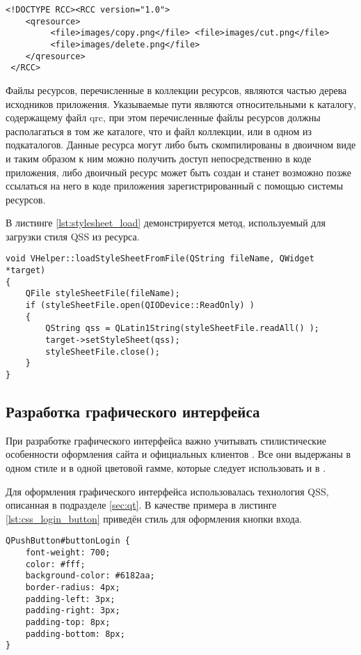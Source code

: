 \begin{lstlisting}[style = cssstyle, 
				   caption = {Пример файла qrc},
				   label = lst:qrc_example] 
<!DOCTYPE RCC><RCC version="1.0"> 
	<qresource>
	     <file>images/copy.png</file> <file>images/cut.png</file>
	     <file>images/delete.png</file>
	</qresource>
 </RCC>
\end{lstlisting} 

Файлы ресурсов, перечисленные в коллекции ресурсов, являются частью дерева
исходников приложения. Указываемые пути являются относительными к каталогу,
содержащему файл qrc, при этом перечисленные файлы ресурсов должны располагаться
в том же каталоге, что и файл коллекции, или в одном из подкаталогов.
Данные ресурса могут либо быть скомпилированы в двоичном виде и таким образом к
ним можно получить доступ непосредственно в коде приложения, либо двоичный
ресурс может быть создан и станет возможно позже ссылаться на него в коде
приложения зарегистрированный с помощью системы ресурсов.

В листинге \ref{lst:stylesheet_load} демонстрируется метод, используемый для
загрузки стиля QSS из ресурса.
\begin{lstlisting}[style = cstyle, 
				   caption = {Загрузка стиля для виджета из файла},
				   label = lst:stylesheet_load] 
void VHelper::loadStyleSheetFromFile(QString fileName, QWidget *target)
{
    QFile styleSheetFile(fileName);
    if (styleSheetFile.open(QIODevice::ReadOnly) )
    {
        QString qss = QLatin1String(styleSheetFile.readAll() );
        target->setStyleSheet(qss);
        styleSheetFile.close();
    }
}
\end{lstlisting}

\subsection{Разработка графического интерфейса}

При разработке графического интерфейса важно учитывать стилистические
особенности оформления сайта и официальных клиентов \vk{}. Все они выдержаны в
одном стиле и в одной цветовой гамме, которые следует использовать и в \vkapp{}.

Для оформления графического интерфейса использовалась технология QSS, описанная
в подразделе \ref{sec:qt}. В качестве примера в листинге
\ref{lst:css_login_button} приведён стиль для оформления кнопки входа.

\begin{lstlisting}[style = cssstyle, 
				   caption = {QSS-стиль для оформления кнопки входа},
				   label = lst:css_login_button] 
QPushButton#buttonLogin {
	font-weight: 700;
	color: #fff;
	background-color: #6182aa;
	border-radius: 4px;
	padding-left: 3px;
	padding-right: 3px;
	padding-top: 8px;
	padding-bottom: 8px;
}
\end{lstlisting}

